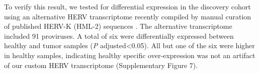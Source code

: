 To verify this result, we tested for differential expression in the discovery cohort using an alternative HERV transcriptome recently compiled by manual curation of published HERV-K (HML-2) sequences \citep{Grabski2020}.
The alternative transcriptome included 91 proviruses.
A total of six were differentially expressed between healthy and tumor samples (\emph{P} adjusted<0.05).
All but one of the six were higher in healthy samples, indicating healthy specific over-expression was not an artifact of our custom HERV transcriptome (Supplementary Figure 7).
